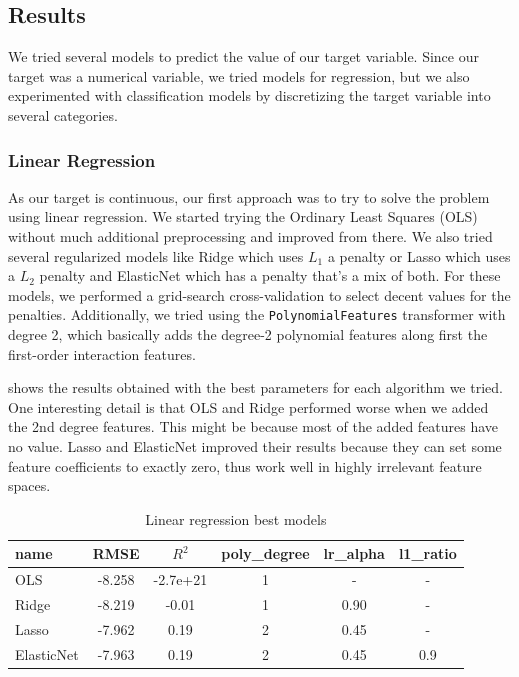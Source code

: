 \pagebreak
\subsection{Results}%
\label{sub:results}

We tried several models to predict the value of our target variable. Since our target
was a numerical variable, we tried models for regression, but we also experimented with
classification models by discretizing the target variable into several categories.

\subsubsection{Linear Regression}%
\label{ssub:linear-regression}

As our target is continuous, our first approach was to try to solve the problem using linear regression. We started trying the Ordinary Least Squares (OLS) without much additional preprocessing and improved from there. We also tried several regularized models like Ridge which uses $L_1$ a penalty or Lasso which uses a $L_2$ penalty and ElasticNet which has a penalty that's a mix of both. For these models, we performed a grid-search cross-validation to select decent values for the penalties. Additionally, we tried using the \texttt{PolynomialFeatures} transformer with degree 2, which basically adds the degree-2 polynomial features along first the first-order interaction features.

 shows the results obtained with the best parameters for each algorithm we tried. One interesting detail is that OLS and Ridge performed worse when we added the 2nd degree features. This might be because most of the added features have no value.  Lasso and ElasticNet improved their results because they can set some feature coefficients to exactly zero, thus work well in highly irrelevant feature spaces. 

\begin{table}[H]
    \centering
    \begin{tabular}{lccccc}
        \toprule
        name & RMSE & $R^2$ & poly\_degree &  lr\_alpha &  l1\_ratio \\
        \midrule
        OLS & -8.258 & -2.7e+21 &       1 &        -   &        - \\
        Ridge & -8.219 &  -0.01 &        1 &       0.90 &        - \\
        Lasso & -7.962 &  0.19  &         2 &       0.45 &        - \\
        ElasticNet & -7.963 &  0.19 &      2 &       0.45 &      0.9 \\
        \bottomrule
    \end{tabular}
    \caption{Linear regression best models}
    \label{ml:lr}
\end{table}

